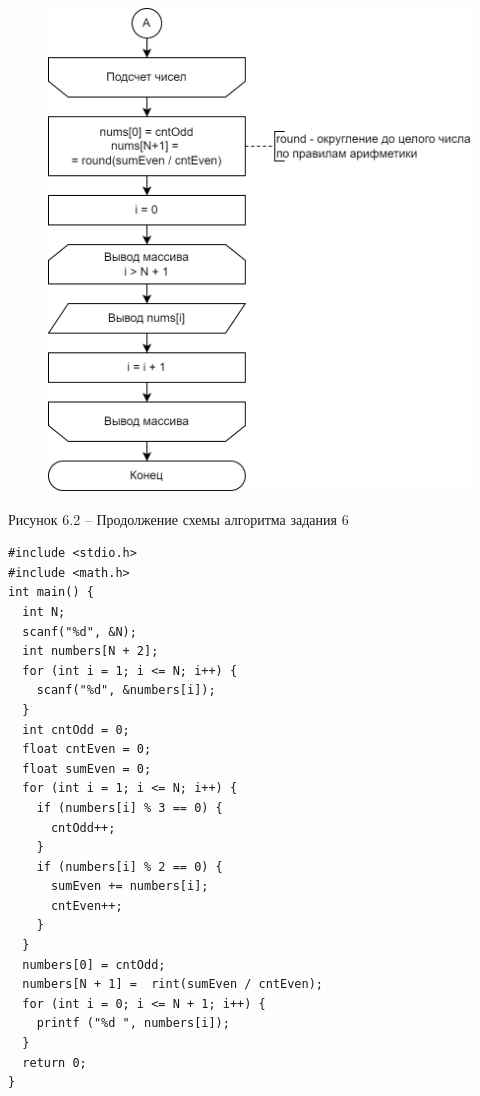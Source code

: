\documentclass[a4paper,14pt]{extarticle}
\begin{document}
  \pagebreak
  \begin{figure}[h]
    \centering
    \includegraphics[width=0.55\linewidth]{schemes/s-6-2}
  \end{figure}
  \begin{center}
    Рисунок 6.2 – Продолжение схемы алгоритма задания 6
  \end{center}
  \begin{lstlisting}[tabsize=2,basicstyle=\ttfamily]
#include <stdio.h>
#include <math.h>
int main() {
  int N;
  scanf("%d", &N);
  int numbers[N + 2];
  for (int i = 1; i <= N; i++) {
    scanf("%d", &numbers[i]);
  }
  int cntOdd = 0;
  float cntEven = 0;
  float sumEven = 0;
  for (int i = 1; i <= N; i++) {
    if (numbers[i] % 3 == 0) {
      cntOdd++;
    }
    if (numbers[i] % 2 == 0) {
      sumEven += numbers[i];
      cntEven++;
    }
  }
  numbers[0] = cntOdd;
  numbers[N + 1] =  rint(sumEven / cntEven);
  for (int i = 0; i <= N + 1; i++) {
    printf ("%d ", numbers[i]);
  }
  return 0;
}
  \end{lstlisting}

  \newpage
\end{document}
